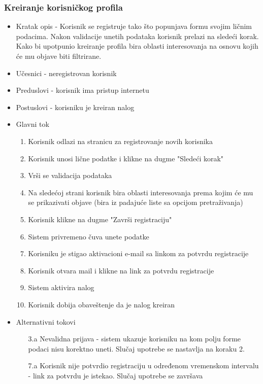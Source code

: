 \subsubsection{Kreiranje korisničkog profila}
\begin{itemize}
	\item Kratak opis - Korisnik se registruje tako što popunjava formu svojim ličnim podacima. Nakon validacije unetih podataka korisnik prelazi na sledeći korak. Kako bi upotpunio kreiranje profila bira oblasti interesovanja na osnovu kojih će mu objave biti filtrirane.
	\item Učesnici - neregistrovan korisnik
	\item Preduslovi - korisnik ima pristup internetu
	\item Postuslovi - korisniku je kreiran nalog
	\item Glavni tok
	\begin{enumerate}
		\item Korisnik odlazi na stranicu za registrovanje novih korisnika
		\item Korisnik unosi lične podatke i klikne na dugme "Sledeći korak"
		\item Vrši se validacija podataka
		\item Na sledećoj strani korisnik bira oblasti interesovanja prema kojim će mu se prikazivati objave (bira iz padajuće liste sa opcijom pretraživanja)
		\item Korisnik klikne na dugme "Završi registraciju"
		\item Sistem privremeno čuva unete podatke
		\item Korisniku je stigao aktivacioni e-mail sa linkom za potvrdu registracije
		\item Korisnik otvara mail i klikne na link za potvrdu registracije
		\item Sistem aktivira nalog
		\item Korisnik dobija obaveštenje da je nalog kreiran
	\end{enumerate}
	\item Alternativni tokovi
	\begin{itemize}
		\item[3.a] Nevalidna prijava - sistem ukazuje korisniku na kom polju forme podaci nisu korektno uneti. Slučaj upotrebe se nastavlja na koraku 2.
		\item[7.a] Korisnik nije potvrdio registraciju u određenom vremenskom intervalu - link za potvrdu je istekao. Slučaj upotrebe se završava
	\end{itemize}
\end{itemize}


